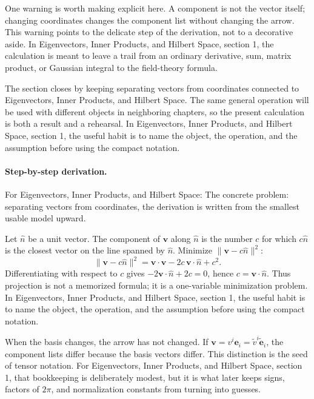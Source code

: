 One warning is worth making explicit here.  A component is not the vector itself; changing coordinates changes the component list without changing the arrow.  This warning points to the delicate step of the derivation, not to a decorative aside.  In Eigenvectors, Inner Products, and Hilbert Space, section 1, the calculation is meant to leave a trail from an ordinary derivative, sum, matrix product, or Gaussian integral to the field-theory formula.

The section closes by keeping separating vectors from coordinates connected to Eigenvectors, Inner Products, and Hilbert Space.  The same general operation will be used with different objects in neighboring chapters, so the present calculation is both a result and a rehearsal.  In Eigenvectors, Inner Products, and Hilbert Space, section 1, the useful habit is to name the object, the operation, and the assumption before using the compact notation.



\paragraph{Step-by-step derivation.}

For Eigenvectors, Inner Products, and Hilbert Space: The concrete problem: separating vectors from coordinates, the derivation is written from the smallest usable model upward.

Let \(\hat n\) be a unit vector.  The component of \(\bm v\) along \(\hat n\) is the number \(c\) for which \(c\hat n\) is the closest vector on the line spanned by \(\hat n\).  Minimize \(\|\bm v-c\hat n\|^2\):
\[
  \|\bm v-c\hat n\|^2=\bm v\cdot\bm v-2c\,\bm v\cdot\hat n+c^2.
\]
Differentiating with respect to \(c\) gives \(-2\bm v\cdot\hat n+2c=0\), hence \(c=\bm v\cdot\hat n\).  Thus projection is not a memorized formula; it is a one-variable minimization problem.  In Eigenvectors, Inner Products, and Hilbert Space, section 1, the useful habit is to name the object, the operation, and the assumption before using the compact notation.

When the basis changes, the arrow has not changed.  If \(\bm v=v^i\bm e_i=\tilde v^i\tilde{\bm e}_i\), the component lists differ because the basis vectors differ.  This distinction is the seed of tensor notation.  For Eigenvectors, Inner Products, and Hilbert Space, section 1, that bookkeeping is deliberately modest, but it is what later keeps signs, factors of \(2\pi\), and normalization constants from turning into guesses.

